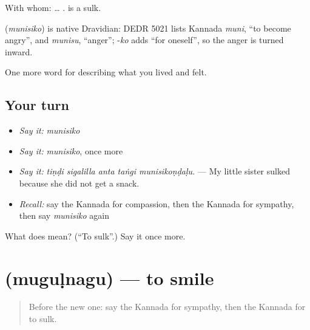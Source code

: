 With whom: …  .  is a sulk.

\begin{cousinweb}
\textbf{} (\emph{munisiko}) is native Dravidian: DEDR 5021 lists Kannada \emph{muni}, \textquotedblleft{}to become angry\textquotedblright{}, and \emph{munisu}, \textquotedblleft{}anger\textquotedblright{}; -\emph{ko} adds \textquotedblleft{}for oneself\textquotedblright{}, so the anger is turned inward.
\end{cousinweb}

\begin{grammarlens}[title={What you've built}]
One more word for describing what you lived and felt.
\end{grammarlens}

\subsection*{Your turn}
\begin{itemize}
\raggedright
  \item \emph{Say it:} \emph{munisiko}
  \item \emph{Say it:} \emph{munisiko}, once more
  \item \emph{Say it:} \emph{tiṇḍi sigalilla anta taṅgi munisikoṇḍaḷu.} — My little sister sulked because she did not get a snack.
  \item \emph{Recall:} say the Kannada for compassion, then the Kannada for sympathy, then say \emph{munisiko} again
\end{itemize}

\begin{tcolorbox}[breakable,colback=teal!4,colframe=teal!35!black,title={Before you move on}]
What does  mean? (\textquotedblleft{}To sulk\textquotedblright{}.) Say it once more.
\end{tcolorbox}
\section[\texorpdfstring{\kn{ಮುಗುಳ್ನಗು} (muguḷnagu)}{ಮುಗುಳ್ನಗು (muguḷnagu)}]{ (muguḷnagu) — to smile}

\label{lesson:KA-C499-mugulnagu}



\begin{quote}
Before the new one: say the Kannada for sympathy, then the Kannada for to sulk.
\end{quote}

